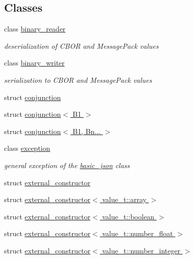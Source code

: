 \subsection*{Classes}
\begin{DoxyCompactItemize}
\item 
class \hyperlink{classnlohmann_1_1detail_1_1binary__reader}{binary\+\_\+reader}
\begin{DoxyCompactList}\small\item\em deserialization of C\+B\+OR and Message\+Pack values \end{DoxyCompactList}\item 
class \hyperlink{classnlohmann_1_1detail_1_1binary__writer}{binary\+\_\+writer}
\begin{DoxyCompactList}\small\item\em serialization to C\+B\+OR and Message\+Pack values \end{DoxyCompactList}\item 
struct \hyperlink{structnlohmann_1_1detail_1_1conjunction}{conjunction}
\item 
struct \hyperlink{structnlohmann_1_1detail_1_1conjunction_3_01_b1_01_4}{conjunction$<$ B1 $>$}
\item 
struct \hyperlink{structnlohmann_1_1detail_1_1conjunction_3_01_b1_00_01_bn_8_8_8_01_4}{conjunction$<$ B1, Bn... $>$}
\item 
class \hyperlink{classnlohmann_1_1detail_1_1exception}{exception}
\begin{DoxyCompactList}\small\item\em general exception of the \hyperlink{classnlohmann_1_1basic__json}{basic\+\_\+json} class \end{DoxyCompactList}\item 
struct \hyperlink{structnlohmann_1_1detail_1_1external__constructor}{external\+\_\+constructor}
\item 
struct \hyperlink{structnlohmann_1_1detail_1_1external__constructor_3_01value__t_1_1array_01_4}{external\+\_\+constructor$<$ value\+\_\+t\+::array $>$}
\item 
struct \hyperlink{structnlohmann_1_1detail_1_1external__constructor_3_01value__t_1_1boolean_01_4}{external\+\_\+constructor$<$ value\+\_\+t\+::boolean $>$}
\item 
struct \hyperlink{structnlohmann_1_1detail_1_1external__constructor_3_01value__t_1_1number__float_01_4}{external\+\_\+constructor$<$ value\+\_\+t\+::number\+\_\+float $>$}
\item 
struct \hyperlink{structnlohmann_1_1detail_1_1external__constructor_3_01value__t_1_1number__integer_01_4}{external\+\_\+constructor$<$ value\+\_\+t\+::number\+\_\+integer $>$}

\end{DoxyCompactItemize}
